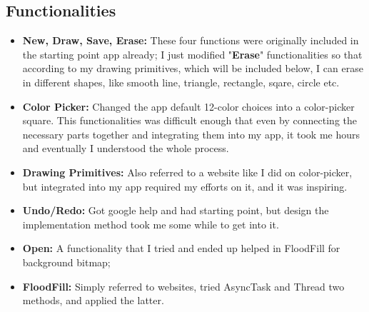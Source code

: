 \documentclass[9pt,b5paper]{article}
\begin{document}
\subsection{Functionalities}
\label{sec-2-1}
\begin{itemize}
\item \textbf{New, Draw, Save, Erase:} These four functions were originally included in the starting point app already; I just modified "\textbf{Erase}" functionalities so that according to my drawing primitives, which will be included below, I can erase in different shapes, like smooth line, triangle, rectangle, sqare, circle etc.
\item \textbf{Color Picker:} Changed the app default 12-color choices into a color-picker square. This functionalities was difficult enough that even by connecting the necessary parts together and integrating them into my app, it took me hours and eventually I understood the whole process.
\item \textbf{Drawing Primitives:} Also referred to a website like I did on color-picker, but integrated into my app required my efforts on it, and it was inspiring.
\item \textbf{Undo/Redo:} Got google help and had starting point, but design the implementation method took me some while to get into it.
\item \textbf{Open:} A functionality that I tried and ended up helped in FloodFill for background bitmap;
\item \textbf{FloodFill:} Simply referred to websites, tried AsyncTask and Thread two methods, and applied the latter.
\end{itemize}
\end{document}
